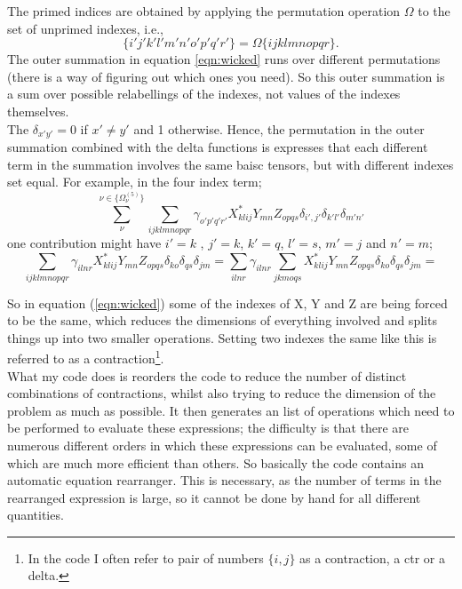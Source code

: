 \documentclass[12pt]{article}
\begin{document}
The primed indices are obtained by applying the permutation operation
$\Omega$ to the set of unprimed indexes, i.e.,
\begin{equation}
 \{i'j'k'l'm'n'o'p'q'r'\} = \Omega\{ijklmnopqr\}.
\end{equation}
The outer summation in equation \ref{eqn:wicked} runs over different permutations (there is a way of figuring out
which ones you need). So this outer summation is a sum over possible relabellings of the indexes,
not values of the indexes themselves.\\

The $\delta_{x'y'}=  0$ if $x'\neq y'$ and 1 otherwise.  Hence, the permutation in the outer summation
combined with the delta functions is expresses that each different term in the summation involves
the same baisc tensors, but with different indexes set equal.
For example, in the four index term;
\begin{equation}
\sum_{\nu}^{ \nu \in \{\Omega^{(5)}_{\nu}\}}
\sum_{ijklmnopqr}
\gamma_{o'p'q'r'}
X^{*}_{klij}Y_{mn}Z_{opqs}\delta_{i',j'}\delta_{k'l'}\delta_{m'n'}
\end{equation}
one contribution might have $i'=k$ , $j'=k$, $k'=q$, $l'=s$, $m'=j$ and $n'=m$;
\begin{equation}
\sum_{ijklmnopqr}
\gamma_{ilnr}
X^{*}_{klij}Y_{mn}Z_{opqs}\delta_{ko}\delta_{qs}\delta_{jm}= 
\sum_{ilnr}
\gamma_{ilnr}
\sum_{jkmoqs}
X^{*}_{klij}Y_{mn}Z_{opqs}\delta_{ko}\delta_{qs}\delta_{jm}= 
\end{equation}

So in equation (\ref{eqn:wicked}) some of the indexes of X, Y and Z are being
forced to be the same, which reduces the dimensions of everything involved and
splits things up into two smaller operations.
Setting two indexes the same like this is referred to as a contraction\footnote{In the code
I often refer to pair of numbers $\{i,j\}$ as a contraction, a ctr or a delta.}.\\

What my code does is reorders the code to reduce the number of distinct combinations of contractions,
whilst also trying to reduce the dimension of the problem as much as possible. It then
generates an list of operations which need to be performed to evaluate these
expressions; the difficulty is that there are numerous different orders in
which these expressions can be evaluated, some of which are much more efficient
than others. So basically the code contains an automatic equation rearranger. 
This is necessary, as the number of terms in the rearranged expression is large,
so it cannot be done by hand for all different quantities.\\
\end{document}
